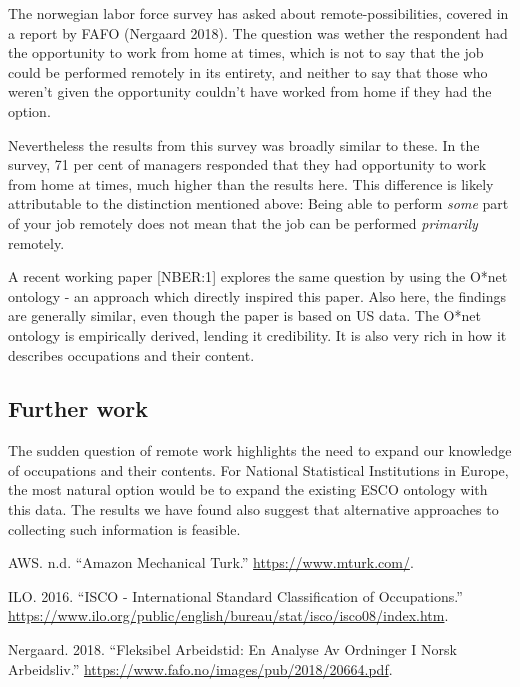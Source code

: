 \documentclass[]{article}
\begin{document}
The norwegian labor force survey has asked about remote-possibilities,
covered in a report by FAFO (Nergaard 2018). The question was wether the
respondent had the opportunity to work from home at times, which is not
to say that the job could be performed remotely in its entirety, and
neither to say that those who weren't given the opportunity couldn't
have worked from home if they had the option.

Nevertheless the results from this survey was broadly similar to these.
In the survey, 71 per cent of managers responded that they had
opportunity to work from home at times, much higher than the results
here. This difference is likely attributable to the distinction
mentioned above: Being able to perform \emph{some} part of your job
remotely does not mean that the job can be performed \emph{primarily}
remotely.

A recent working paper {[}NBER:1{]} explores the same question by using
the O*net ontology - an approach which directly inspired this paper.
Also here, the findings are generally similar, even though the paper is
based on US data. The O*net ontology is empirically derived, lending it
credibility. It is also very rich in how it describes occupations and
their content.

\hypertarget{further-work}{%
\subsection{Further work}\label{further-work}}

The sudden question of remote work highlights the need to expand our
knowledge of occupations and their contents. For National Statistical
Institutions in Europe, the most natural option would be to expand the
existing ESCO ontology with this data. The results we have found also
suggest that alternative approaches to collecting such information is
feasible.

\hypertarget{refs}{}
\leavevmode\hypertarget{ref-MT}{}%
AWS. n.d. ``Amazon Mechanical Turk.'' \url{https://www.mturk.com/}.

\leavevmode\hypertarget{ref-ISCO:08}{}%
ILO. 2016. ``ISCO - International Standard Classification of
Occupations.''
\url{https://www.ilo.org/public/english/bureau/stat/isco/isco08/index.htm}.

\leavevmode\hypertarget{ref-FAFO:HK}{}%
Nergaard. 2018. ``Fleksibel Arbeidstid: En Analyse Av Ordninger I Norsk
Arbeidsliv.'' \url{https://www.fafo.no/images/pub/2018/20664.pdf}.
\end{document}
